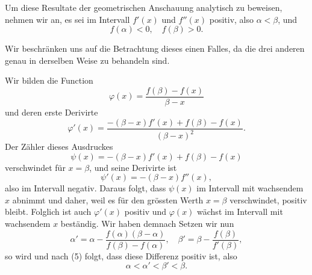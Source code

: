 
Um diese Resultate der geometrischen Anschauung analytisch
 zu beweisen, nehmen wir an, es sei im Intervall $f'(x)$ und
$f''(x)$ positiv, also $\alpha < \beta$, und
\[
f(\alpha) < 0, \quad f(\beta) > 0.
\]

Wir beschr\"anken uns auf die Betrachtung dieses einen
Falles, da die drei anderen genau in derselben Weise zu behandeln
 sind.

Wir bilden die Function
\[
\varphi(x) = \frac{f(\beta) - f(x)}{\beta - x}
\]
und deren erste Derivirte
\[
\varphi'(x) = \frac{-(\beta - x)f'(x) + f(\beta) - f(x)}{(\beta - x)^2}.
\]
Der Z\"ahler dieses Ausdruckes
\[
\psi(x) = -(\beta - x)f'(x) + f(\beta) - f(x)
\]
verschwindet f\"ur $x = \beta$, und seine Derivirte ist
\[
\psi'(x) = -(\beta - x)f''(x),
\]
also im Intervall negativ. Daraus folgt, dass $\psi(x)$ im Intervall
mit wachsendem $x$ abnimmt und daher, weil es f\"ur den gr\"ossten
Werth $x = \beta$ verschwindet, positiv bleibt. Folglich ist auch
$\varphi'(x)$ positiv und $\varphi(x)$ w\"achst im Intervall mit wachsendem $x$
best\"andig. Wir haben demnach
Setzen wir nun
\[
\alpha' = \alpha - \frac{f(\alpha)(\beta - \alpha)}{f(\beta) - f(\alpha)}, \quad \beta' = \beta - \frac{f(\beta)}{f'(\beta)},
\]
so wird
und nach (5) folgt, dass diese Differenz positiv ist, also
\[
\alpha < \alpha' < \beta' < \beta.
\]
